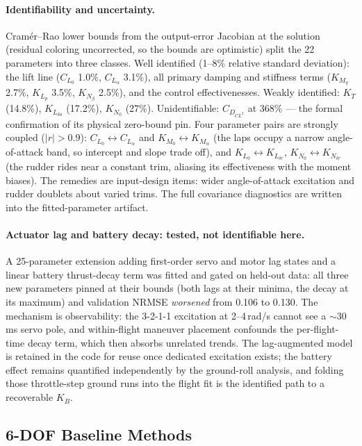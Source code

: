 \documentclass[11pt]{article}
\begin{document}
\paragraph{Identifiability and uncertainty.} Cram\'er--Rao lower bounds
from the output-error Jacobian at the solution (residual coloring
uncorrected, so the bounds are optimistic) split the 22 parameters into
three classes. Well identified (1--8\% relative standard deviation): the
lift line ($C_{L_0}$ 1.0\%, $C_{L_\alpha}$ 3.1\%), all primary damping
and stiffness terms ($K_{M_q}$ 2.7\%, $K_{L_p}$ 3.5\%, $K_{N_\beta}$
2.5\%), and the control effectivenesses. Weakly identified: $K_T$
(14.8\%), $K_{L_{\delta a}}$ (17.2\%), $K_{N_0}$ (27\%). Unidentifiable:
$C_{D_{CL^2}}$ at 368\% --- the formal confirmation of its physical
zero-bound pin. Four parameter pairs are strongly coupled
($|r|>0.9$): $C_{L_0}\!\leftrightarrow\!C_{L_\alpha}$ and
$K_{M_0}\!\leftrightarrow\!K_{M_\alpha}$ (the laps occupy a narrow
angle-of-attack band, so intercept and slope trade off), and
$K_{L_0}\!\leftrightarrow\!K_{L_{\delta r}}$,
$K_{N_0}\!\leftrightarrow\!K_{N_{\delta r}}$ (the rudder rides near a
constant trim, aliasing its effectiveness with the moment biases). The
remedies are input-design items: wider angle-of-attack excitation and
rudder doublets about varied trims. The full covariance diagnostics are
written into the fitted-parameter artifact.

\paragraph{Actuator lag and battery decay: tested, not identifiable here.}
A 25-parameter extension adding first-order servo and motor lag states and
a linear battery thrust-decay term was fitted and gated on held-out data:
all three new parameters pinned at their bounds (both lags at their minima,
the decay at its maximum) and validation NRMSE \emph{worsened} from 0.106
to 0.130. The mechanism is observability: the 3-2-1-1 excitation at
2--4\,rad/s cannot see a $\sim$30\,ms servo pole, and within-flight
maneuver placement confounds the per-flight-time decay term, which then
absorbs unrelated trends. The lag-augmented model is retained in the code
for reuse once dedicated excitation exists; the battery effect remains
quantified independently by the ground-roll analysis, and folding those
throttle-step ground runs into the flight fit is the identified path to a
recoverable $K_B$.

\subsection{6-DOF Baseline Methods}
\end{document}
